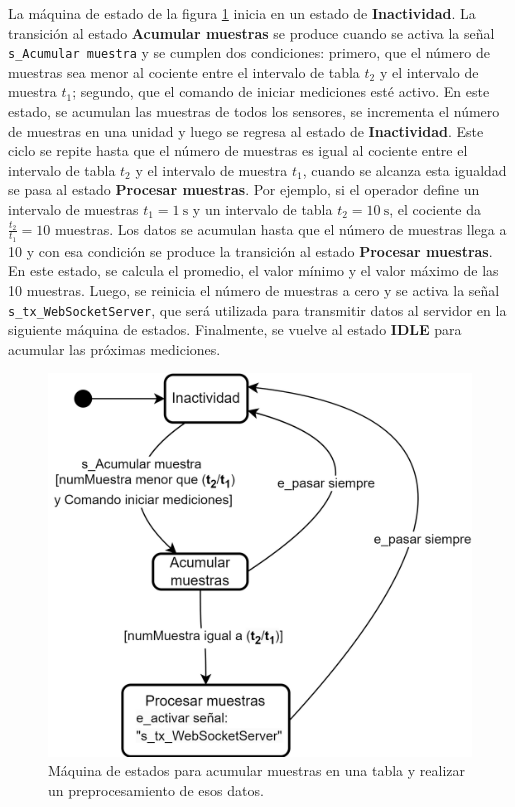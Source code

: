 La máquina de estado de la figura \ref{fig:sc_processing} inicia en un estado de \textbf{Inactividad}. La transición al estado \textbf{Acumular muestras} se produce cuando se activa la señal \texttt{s\_Acumular muestra}  y se cumplen dos condiciones: primero, que el número de muestras sea menor al cociente entre el intervalo de tabla $t_{2}$ y el intervalo de muestra $t_{1}$; segundo, que el comando de iniciar mediciones esté activo. En este estado, se acumulan las muestras de todos los sensores, se incrementa el número de muestras en una unidad y luego se regresa al estado de \textbf{Inactividad}. Este ciclo se repite hasta que el número de muestras es igual al cociente entre el intervalo de tabla $t_{2}$ y el intervalo de muestra $t_{1}$, cuando se alcanza esta igualdad se pasa al estado \textbf{Procesar muestras}. Por ejemplo, si el operador define un intervalo de muestras $t_{1} = \SI{1}{\second}$ y un intervalo de tabla $t_{2} = \SI{10}{\second}$, el cociente da $\frac{t_{2}}{t_{1}}=10$ muestras. Los datos se acumulan hasta que el número de muestras llega a 10 y con esa condición se produce la transición al estado \textbf{Procesar muestras}. En este estado, se calcula el promedio, el valor mínimo y el valor máximo de las 10 muestras. Luego, se reinicia el número de muestras a cero y se activa la señal \texttt{s\_tx\_WebSocketServer}, que será utilizada para transmitir datos al servidor en la siguiente máquina de estados. Finalmente, se vuelve al estado \textbf{IDLE} para acumular las próximas mediciones.


\begin{figure}[H]
    \centering
    \includegraphics[width=0.6\linewidth]{Figuras/datalogger/Firmware/sc_processing.png}
    \caption{Máquina de estados para acumular muestras en una tabla y realizar un preprocesamiento de esos datos.}
    \label{fig:sc_processing}
\end{figure}

